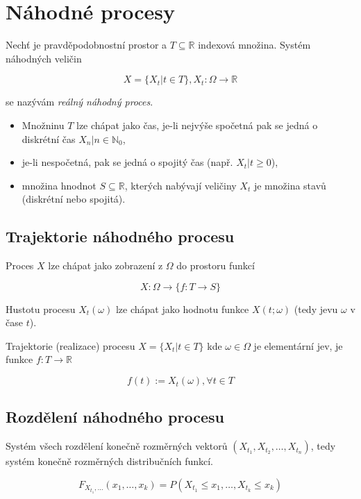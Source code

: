 \section{Náhodné procesy}

Nechť \pspace je pravděpodobnostní prostor a $T\subseteq \mathbb{R}$ indexová množina.
Systém náhodných veličin

$$
    X = \{X_t | t \in T\}, X_t: \Omega \rightarrow \mathbb{R}
$$

se nazývám \textit{reálný náhodný proces}.

\begin{itemize}
    \item Množninu $T$ lze chápat jako čas, je-li nejvýše spočetná pak se jedná o diskrétní čas ${X_n | n\in \mathbb{N}_0}$,
    \item je-li nespočetná, pak se jedná o spojitý čas (např. ${X_t | t \geq 0}$),
    \item množina hnodnot $S \subseteq \mathbb{R}$, kterých nabývají veličiny $X_t$ je množina stavů (diskrétní nebo spojitá). 
\end{itemize}

\subsection{Trajektorie náhodného procesu}

Proces $X$ lze chápat jako zobrazení z $\Omega$ do prostoru funkcí

$$
    X: \Omega \rightarrow \{f: T \rightarrow S\}
$$

Hustotu procesu $X_t(\omega)$ lze chápat jako hodnotu funkce $X(t;\omega)$ (tedy jevu $\omega$ v čase $t$).

Trajektorie (realizace) procesu $X=\{X_t | t\in T\}$ kde $\omega \in \Omega$ je elementární jev, je funkce $f: T \rightarrow \mathbb{R}$

$$
    f(t) := X_t(\omega), \forall{t \in T}
$$

\subsection{Rozdělení náhodného procesu}

Systém všech rozdělení konečně rozměrných vektorů $(X_{t_1}, X_{t_2}, \dots, X_{t_n})$, tedy systém konečně rozměrných distribučních funkcí.

$$
    F_{X_{t_1},\dots}(x_1, \dots, x_k) = P(X_{t_1} \leq x_1, \dots, X_{t_k} \leq x_k)
$$

